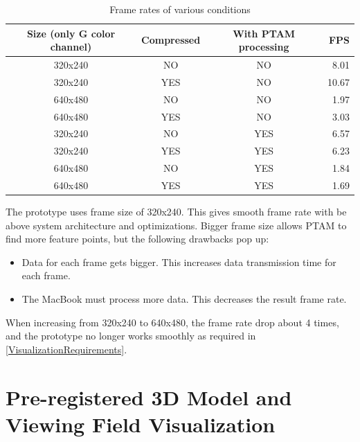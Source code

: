 \begin{table}[tb]
	\begin{center}
		\caption{Frame rates of various conditions}
		\label{tb:FrameRates}
		\begin{tabular}{|c|c|c|r|}
			\hline
			Size (only G color channel) & Compressed & With PTAM processing & FPS   \\
			\hline
			320x240 & NO         & NO                   &  8.01 \\
			320x240 & YES        & NO                   & 10.67 \\
			640x480 & NO         & NO                   &  1.97 \\
			640x480 & YES        & NO                   &  3.03 \\
			320x240 & NO         & YES                  &  6.57 \\
			320x240 & YES        & YES                  &  6.23 \\
			640x480 & NO         & YES                  &  1.84 \\
			640x480 & YES        & YES                  &  1.69 \\
			\hline
		\end{tabular}
	\end{center}
\end{table}

The prototype uses frame size of 320x240. This gives smooth frame rate with be above system architecture and optimizations. Bigger frame size allows PTAM to find more feature points, but the following drawbacks pop up:

\begin{itemize}
	\item Data for each frame gets bigger. This increases data transmission time for each frame.
	\item The MacBook must process more data. This decreases the result frame rate.
\end{itemize}

When increasing from 320x240 to 640x480, the frame rate drop about 4 times, and the prototype no longer works smoothly as required in \ref{VisualizationRequirements}.


\section{Pre-registered 3D Model and Viewing Field Visualization}
\label{3DModel}


